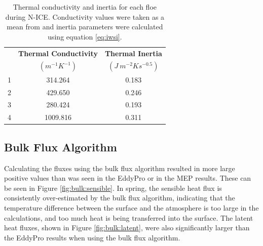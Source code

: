 \begin{table}[t]
\centering
\footnotesize
\doublespacing
{
\begin{tabular}{| c | c | c |}
 \hline
\rowcolor[HTML]{F3F3F3}  & \textbf{Thermal Conductivity} & \textbf{Thermal Inertia}\\
 \rowcolor[HTML]{F3F3F3}\multirow{-2}{*}{\textbf{Floe}} & $(m^{-1}K^{-1})$ & $(J~m^{-2}Ks^{-0.5})$ \\
  \hline
 1 & 314.264 & 0.183  \\
 2 & 429.650 & 0.246 \\ 
 3 & 280.424 & 0.193 \\
 4 & 1009.816 & 0.311 \\
  \hline
\end{tabular}}
\caption[Thermal conductivity and inertia.]{Thermal conductivity and inertia for each floe during N-ICE. Conductivity values were taken as a mean from \citet{merkouriadi:2017} and inertia parameters were calculated using equation \ref{eq:iwsi}.}
\label{tab:thermal}
\end{table}

\subsection{Bulk Flux Algorithm}
Calculating the fluxes using the bulk flux algorithm resulted in more large positive values than was seen in the EddyPro or in the MEP results. These can be seen in Figure \ref{fig:bulk:sensible}. In spring, the sensible heat flux is consistently over-estimated by the bulk flux algorithm, indicating that the temperature difference between the surface and the atmosphere is too large in the calculations, and too much heat is being transferred into the surface. The latent heat fluxes, shown in Figure \ref{fig:bulk:latent}, were also significantly larger than the EddyPro results when using the bulk flux algorithm. 


